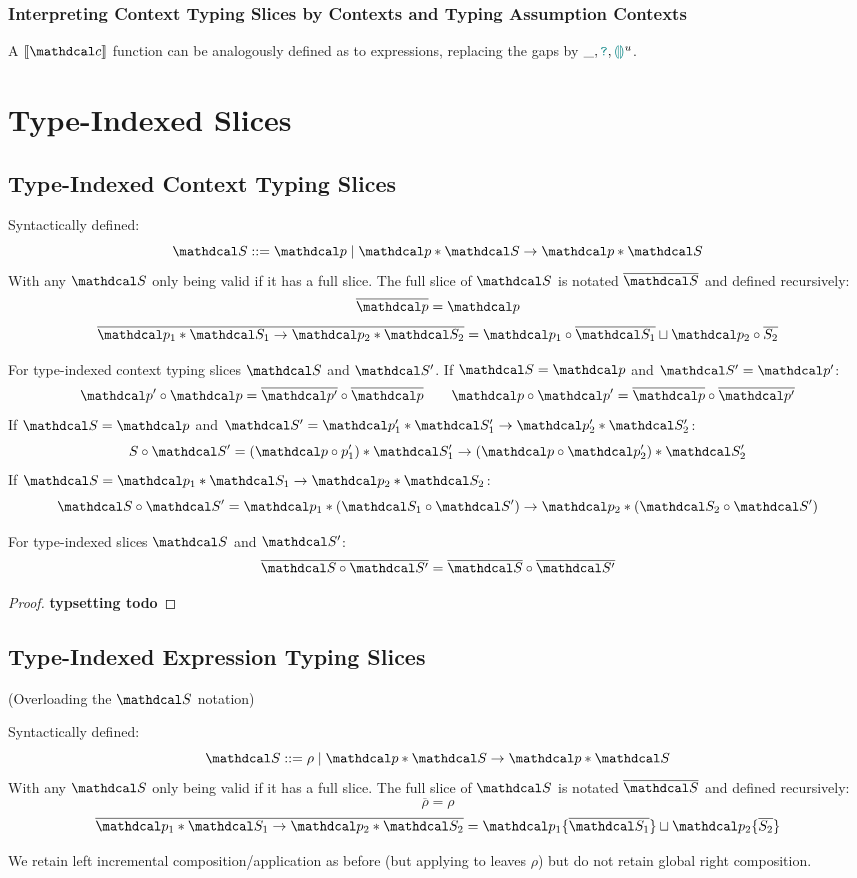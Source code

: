 \subsubsection{Interpreting Context Typing Slices by Contexts and Typing Assumption Contexts}
A $\type{\Cs}$ function can be analogously defined as to expressions, replacing the gaps by $\_, {\color{teal}\texttt{?}},{\color{teal}\llparenthesis}  {\color{teal}\rrparenthesis}^u$.

\section{Type-Indexed Slices}
\subsection{Type-Indexed Context Typing Slices}
\begin{definition}
Syntactically defined: 
\[\S ::= \p \mid \p * \S \to \p * \S\] 
With any $\S$ only being valid if it has a full slice. The full slice of $\S$ is notated $\overline{\S}$ and defined recursively:
\[\overline{\p} = \p\]
\[\overline{\p_1 * \S_1 \to \p_2 * \S_2} = \p_1 \circ \overline{\S_1} \sqcup \p_2 \circ \overline{S_2}\]
\end{definition}
\begin{definition}
For type-indexed context typing slices $\S$ and $\S'$.  If $\S = \p$ and $\S' = \p'$:
\[\p' \circ \p = \overline{\p'} \circ \overline{\p}\qquad \p \circ \p' = \overline{\p} \circ \overline{\p'}\]
If $\S = \p$ and $\S' = \p_1' * \S_1' \to \p_2' * \S_2'$:
\[S \circ \S' = (\p \circ p_1') * \S_1' \to (\p \circ \p_2') * \S_2'\]
If $\S = \p_1 * \S_1 \to \p_2 * \S_2$:
\[\S \circ \S' = \p_1 * (\S_1 \circ \S') \to \p_2 * (\S_2 \circ \S')\]
\end{definition}

\begin{proposition}
For type-indexed slices $\S$ and $\S'$: 
\[\overline{\S \circ \S'} = \overline{\S} \circ \overline{\S'}\]
\end{proposition}
\begin{proof}
\textbf{typsetting todo}
\end{proof}
\subsection{Type-Indexed Expression Typing Slices}
(Overloading the $\S$ notation)
\begin{definition}
Syntactically defined: 
\[\S ::= \rho \mid \p * \S \to \p * \S\] 
With any $\S$ only being valid if it has a full slice. The full slice of $\S$ is notated $\overline{\S}$ and defined recursively:
\[\overline{\rho} = \rho\]
\[\overline{\p_1 * \S_1 \to \p_2 * \S_2} = \p_1 \{ \overline{\S_1}\} \sqcup \p_2 \{ \overline{S_2}\}\]
\end{definition}
We retain left incremental composition/application as before (but applying to leaves $\rho$) but do not retain global right composition.
 
